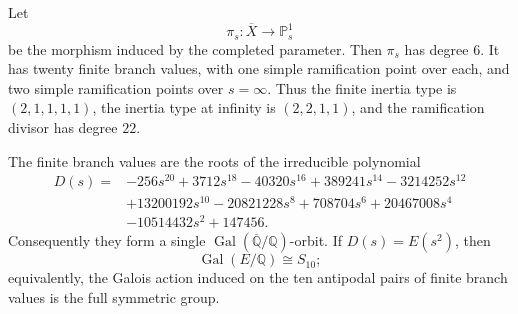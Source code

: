 \begin{theorem}
  \label{thm:sync-completed-ramification}
  Let
  \[
    \pi_s:\overline X\longrightarrow\mathbb P^1_s
  \]
  be the morphism induced by the completed parameter. Then \(\pi_s\)
  has degree \(6\). It has twenty finite branch values, with one simple
  ramification point over each, and two simple ramification points over
  \(s=\infty\). Thus the finite inertia type is
  \((2,1,1,1,1)\), the inertia type at infinity is
  \((2,2,1,1)\), and the ramification divisor has degree \(22\).

  The finite branch values are the roots of the irreducible polynomial
  \[
  \begin{aligned}
    D(s)={}&-256s^{20}+3712s^{18}-40320s^{16}+389241s^{14}
      -3214252s^{12}\\
    &+13200192s^{10}-20821228s^8+708704s^6
      +20467008s^4\\
    &-10514432s^2+147456.
  \end{aligned}
  \]
  Consequently they form a single
  \(\operatorname{Gal}(\overline{\mathbb Q}/\mathbb Q)\)-orbit. If
  \(D(s)=E(s^2)\), then
  \[
    \operatorname{Gal}(E/\mathbb Q)\cong S_{10};
  \]
  equivalently, the Galois action induced on the ten antipodal pairs of
  finite branch values is the full symmetric group.
\end{theorem}


